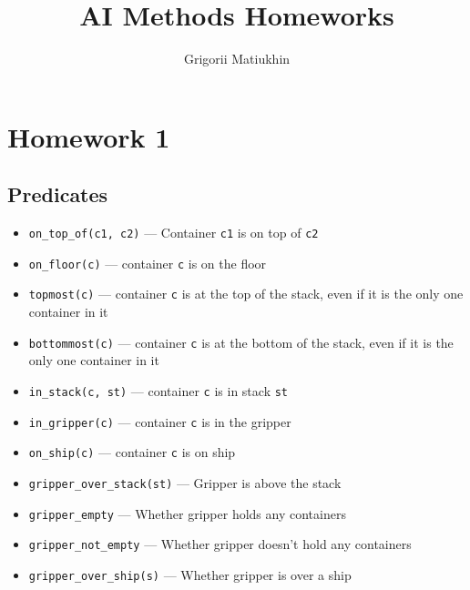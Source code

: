 \documentclass[12pt]{article}
\author{Grigorii Matiukhin}
\title{AI Methods Homeworks}
\begin{document}
\maketitle
\tableofcontents
\newpage

\section{Homework 1}

\subsection{Predicates}
\begin{itemize}
  \item \texttt{on\_top\_of(c1, c2)} --- Container \texttt{c1} is on top of \texttt{c2} 
  \item \texttt{on\_floor(c)} --- container \texttt{c} is on the floor 
  \item \texttt{topmost(c)} --- container \texttt{c} is at the top of the stack, even if it is the only one container in it 
  \item \texttt{bottommost(c)} --- container \texttt{c} is at the bottom of the stack, even if it is the only one container in it 
  \item \texttt{in\_stack(c, st)} --- container \texttt{c} is in stack \texttt{st} 
  \item \texttt{in\_gripper(c)} --- container \texttt{c} is in the gripper 
  \item \texttt{on\_ship(c)} --- container \texttt{c} is on ship 
  \item \texttt{gripper\_over\_stack(st)} --- Gripper is above the stack 
  \item \texttt{gripper\_empty} --- Whether gripper holds any containers 
  \item \texttt{gripper\_not\_empty} --- Whether gripper doesn't hold any containers 
  \item \texttt{gripper\_over\_ship(s)} --- Whether gripper is over a ship
\end{itemize}
\end{document}

